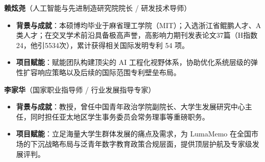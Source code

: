\textbf{赖炫尧}（人工智能与先进制造研究院院长 / 研发技术导师）
\begin{itemize}
    \item \textbf{背景与成就}：本硕博均毕业于麻省理工学院（MIT）；入选浙江省鲲鹏人才、A类人才；在交叉学术前沿具备极高声誉，高影响力期刊发表论文37篇（H指数24，他引5534次），累计获得相关国际发明专利 54 项。
    \item \textbf{项目赋能}：赋能团队构建顶尖的 AI 工程化视野体系，协助优化系统层级的弹性扩容响应策略以及后续的国际范围专利壁垒布局。
\end{itemize}

\textbf{李家华}（国家职业指导师 / 行业发展指导专家）
\begin{itemize}
    \item \textbf{背景与成就}：教授，曾任中国青年政治学院副院长、大学生发展研究中心主任，同时担任亚太地区学生事务委员会常务理事等重磅职务。
    \item \textbf{项目赋能}：立足海量大学生群体发展的痛点及需求，为 LumaMemo 在全国市场的下沉战略布局与泛青年数字教育政策合规层面，提供顶层护航及专家级发展评判。
\end{itemize}
